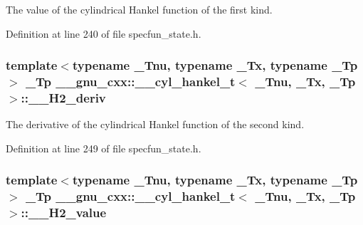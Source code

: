 The value of the cylindrical Hankel function of the first kind. 



Definition at line 240 of file specfun\+\_\+state.\+h.

\subsubsection[{\texorpdfstring{\+\_\+\+\_\+\+H2\+\_\+deriv}{__H2_deriv}}]{\setlength{\rightskip}{0pt plus 5cm}template$<$typename \+\_\+\+Tnu, typename \+\_\+\+Tx, typename \+\_\+\+Tp$>$ \+\_\+\+Tp {\bf \+\_\+\+\_\+gnu\+\_\+cxx\+::\+\_\+\+\_\+cyl\+\_\+hankel\+\_\+t}$<$ \+\_\+\+Tnu, \+\_\+\+Tx, \+\_\+\+Tp $>$\+::\+\_\+\+\_\+\+H2\+\_\+deriv}\hypertarget{struct____gnu__cxx_1_1____cyl__hankel__t_aac63a9d78d5e3ee6520073963da4cbbb}{}\label{struct____gnu__cxx_1_1____cyl__hankel__t_aac63a9d78d5e3ee6520073963da4cbbb}


The derivative of the cylindrical Hankel function of the second kind. 



Definition at line 249 of file specfun\+\_\+state.\+h.

\subsubsection[{\texorpdfstring{\+\_\+\+\_\+\+H2\+\_\+value}{__H2_value}}]{\setlength{\rightskip}{0pt plus 5cm}template$<$typename \+\_\+\+Tnu, typename \+\_\+\+Tx, typename \+\_\+\+Tp$>$ \+\_\+\+Tp {\bf \+\_\+\+\_\+gnu\+\_\+cxx\+::\+\_\+\+\_\+cyl\+\_\+hankel\+\_\+t}$<$ \+\_\+\+Tnu, \+\_\+\+Tx, \+\_\+\+Tp $>$\+::\+\_\+\+\_\+\+H2\+\_\+value}\hypertarget{struct____gnu__cxx_1_1____cyl__hankel__t_a968496d4d370d39f2034657f32860faa}{}\label{struct____gnu__cxx_1_1____cyl__hankel__t_a968496d4d370d39f2034657f32860faa}


